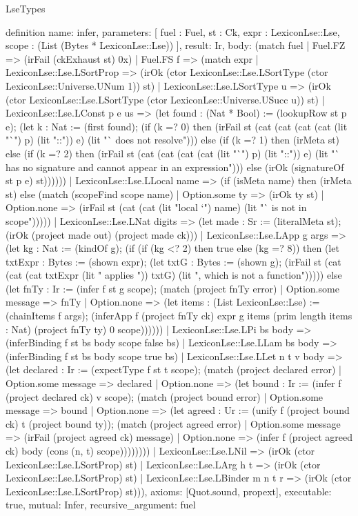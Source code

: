 \begin{lexlean}{LseTypes}
\begin{semanticmodule}
definition{
  name: infer,
  parameters: [
    fuel : Fuel,
    st : Ck,
    expr : LexiconLse::Lse,
    scope : (List (Bytes * LexiconLse::Lse))
  ],
  result: Ir,
  body: (match fuel
    | Fuel.FZ => (irFail (ckExhaust st) 0x)
    | Fuel.FS f => (match expr
      | LexiconLse::Lse.LSortProp => (irOk (ctor LexiconLse::Lse.LSortType (ctor LexiconLse::Universe.UNum 1)) st)
      | LexiconLse::Lse.LSortType u => (irOk (ctor LexiconLse::Lse.LSortType (ctor LexiconLse::Universe.USucc u)) st)
      | LexiconLse::Lse.LConst p e us => (let found : (Nat * Bool) := (lookupRow st p e); (let k : Nat := (first found); (if (k =? 0) then (irFail st (cat (cat (cat (cat (lit "`") p) (lit "::")) e) (lit "` does not resolve"))) else (if (k =? 1) then (irMeta st) else (if (k =? 2) then (irFail st (cat (cat (cat (cat (lit "`") p) (lit "::")) e) (lit "` has no signature and cannot appear in an expression"))) else (irOk (signatureOf st p e) st))))))
      | LexiconLse::Lse.LLocal name => (if (isMeta name) then (irMeta st) else (match (scopeFind scope name)
        | Option.some ty => (irOk ty st)
        | Option.none => (irFail st (cat (cat (lit "local `") name) (lit "` is not in scope")))))
      | LexiconLse::Lse.LNat digits => (let made : Sr := (literalMeta st); (irOk (project made out) (project made ck)))
      | LexiconLse::Lse.LApp g args => (let kg : Nat := (kindOf g); (if (if (kg <? 2) then true else (kg =? 8)) then (let txtExpr : Bytes := (shown expr); (let txtG : Bytes := (shown g); (irFail st (cat (cat (cat txtExpr (lit " applies ")) txtG) (lit ", which is not a function"))))) else (let fnTy : Ir := (infer f st g scope); (match (project fnTy error)
        | Option.some message => fnTy
        | Option.none => (let items : (List LexiconLse::Lse) := (chainItems f args); (inferApp f (project fnTy ck) expr g items (prim length items : Nat) (project fnTy ty) 0 scope))))))
      | LexiconLse::Lse.LPi bs body => (inferBinding f st bs body scope false bs)
      | LexiconLse::Lse.LLam bs body => (inferBinding f st bs body scope true bs)
      | LexiconLse::Lse.LLet n t v body => (let declared : Ir := (expectType f st t scope); (match (project declared error)
        | Option.some message => declared
        | Option.none => (let bound : Ir := (infer f (project declared ck) v scope); (match (project bound error)
          | Option.some message => bound
          | Option.none => (let agreed : Ur := (unify f (project bound ck) t (project bound ty)); (match (project agreed error)
            | Option.some message => (irFail (project agreed ck) message)
            | Option.none => (infer f (project agreed ck) body (cons (n, t) scope))))))))
      | LexiconLse::Lse.LNil => (irOk (ctor LexiconLse::Lse.LSortProp) st)
      | LexiconLse::Lse.LArg h t => (irOk (ctor LexiconLse::Lse.LSortProp) st)
      | LexiconLse::Lse.LBinder m n t r => (irOk (ctor LexiconLse::Lse.LSortProp) st))),
  axioms: [Quot.sound, propext],
  executable: true,
  mutual: Infer,
  recursive_argument: fuel
}


\end{semanticmodule}
\end{lexlean}
